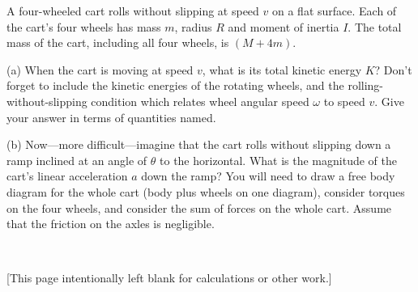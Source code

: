 \documentclass[12pt]{article}
\begin{document}
A four-wheeled cart rolls without slipping at speed $v$ on a flat
surface.  Each of the cart's four wheels has mass $m$, radius $R$ and
moment of inertia $I$.  The total mass of the cart, including all four
wheels, is $(M+4m)$.

(a) When the cart is moving at speed $v$, what is its total kinetic
energy $K$?  Don't forget to include the kinetic energies of the
rotating wheels, and the rolling-without-slipping condition which
relates wheel angular speed $\omega$ to speed $v$.  Give your answer
in terms of quantities named.

\vfill

(b) Now---more difficult---imagine that the cart rolls without
slipping down a ramp inclined at an angle of $\theta$ to the
horizontal.  What is the magnitude of the cart's linear acceleration
$a$ down the ramp?  You will need to draw a free body diagram for the
whole cart (body plus wheels on one diagram), consider torques on the
four wheels, and consider the sum of forces on the whole cart.  Assume
that the friction on the axles is negligible.

\vfill ~

\clearpage

[This page intentionally left blank for calculations or other work.]
\end{document}
